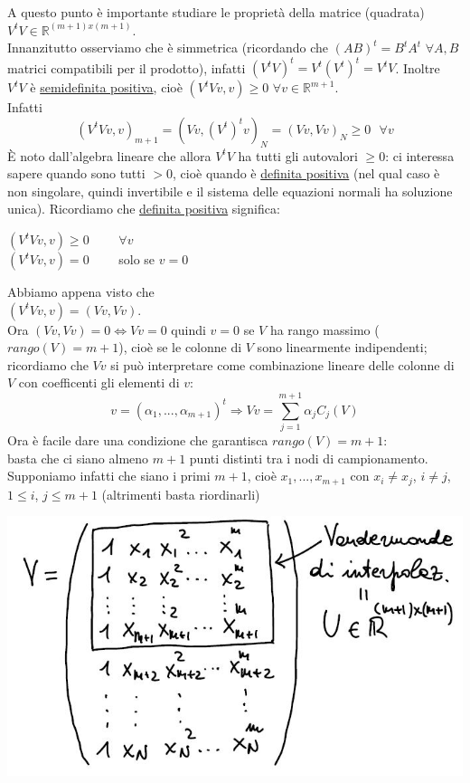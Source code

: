 \documentclass[12pt,a4paper]{article}
\begin{document}
A questo punto è importante studiare le proprietà della matrice (quadrata) $V^tV\in\mathbb{R}^{(m+1)x(m+1)}$.\\Innanzitutto osserviamo che è simmetrica (ricordando che $(AB)^t=B^tA^t$ $\forall A,B$ matrici compatibili per il prodotto), infatti $(V^t V)^t=V^t(V^t)^t=V^tV$. Inoltre $V^tV$ è \underline{semidefinita positiva}, cioè $(V^tVv,v)\geq0$ $\forall v\in\mathbb{R}^{m+1}$.\\ Infatti
\begin{equation*}
    (V^tVv,v)_{m+1}=(Vv,(V^t)^tv)_N=(Vv,Vv)_N\geq0\  \  \  \forall v
\end{equation*}
È noto dall'algebra lineare che allora $V^tV$ ha tutti gli autovalori $\geq0$: ci interessa sapere quando sono tutti $>0$, cioè quando è \underline{definita positiva} (nel qual caso è non singolare, quindi invertibile e il sistema delle equazioni normali ha soluzione unica). Ricordiamo che \underline{definita positiva} significa:
\begin{center}
     $(V^tVv,v)\geq0$ \  \  \   \   $\forall v$   \\
     $(V^tVv,v)=0$  \  \  \  \   solo se $v=0$
\end{center}
Abbiamo appena visto che\\
$(V^tVv,v)=(Vv,Vv)$.\\Ora $(Vv,Vv)=0 \iff Vv=0$ quindi $v=0$ se $V$ ha rango massimo ($rango(V)=m+1$), cioè se le colonne di $V$ sono linearmente indipendenti; ricordiamo che $Vv$ si può interpretare come combinazione lineare delle colonne di $V$ con coefficenti gli elementi di $v$:
\begin{equation*}
    v=(\alpha_1,...,\alpha_{m+1})^t\Rightarrow Vv=\sum_{j=1}^{m+1}\alpha_jC_j(V)
\end{equation*}
Ora è facile dare una condizione che garantisca $rango(V)=m+1$:\\
basta che ci siano almeno $m+1$ punti distinti tra i nodi di campionamento.\\Supponiamo infatti che siano i primi $m+1$, cioè $x_1,...,x_{m+1}$ con $x_i\neq x_j$, $i\neq j$, $1\leq i$, $j\leq m+1$ (altrimenti basta riordinarli)
\begin{center}
    \includegraphics[scale=0.5]{calcolo25.JPG}
\end{center}
\end{document}
